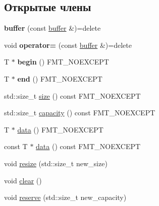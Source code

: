 \subsection*{Открытые члены}
\begin{DoxyCompactItemize}
\item 
\mbox{\label{classinternal_1_1buffer_a33507cbf77635b83d95b20f16c2bd9aa}} 
{\bfseries buffer} (const \hyperlink{classinternal_1_1buffer}{buffer} \&)=delete
\item 
\mbox{\label{classinternal_1_1buffer_aed8f870764a9e4cb1093952a5f297cfd}} 
void {\bfseries operator=} (const \hyperlink{classinternal_1_1buffer}{buffer} \&)=delete
\item 
\mbox{\label{classinternal_1_1buffer_ae45d3da165531762d01d8e17be21ebf1}} 
T $\ast$ {\bfseries begin} () F\+M\+T\+\_\+\+N\+O\+E\+X\+C\+E\+PT
\item 
\mbox{\label{classinternal_1_1buffer_a021ba696a608aba455fc40deccbd17d9}} 
T $\ast$ {\bfseries end} () F\+M\+T\+\_\+\+N\+O\+E\+X\+C\+E\+PT
\item 
std\+::size\+\_\+t \hyperlink{classinternal_1_1buffer_abac844b364cd93450a9c311807d15f80}{size} () const F\+M\+T\+\_\+\+N\+O\+E\+X\+C\+E\+PT
\item 
std\+::size\+\_\+t \hyperlink{classinternal_1_1buffer_ab71f52fc20af6ed2a15f75143c89e2a4}{capacity} () const F\+M\+T\+\_\+\+N\+O\+E\+X\+C\+E\+PT
\item 
T $\ast$ \hyperlink{classinternal_1_1buffer_aaaa371bd0a7aaad4af49363cb85fefb3}{data} () F\+M\+T\+\_\+\+N\+O\+E\+X\+C\+E\+PT
\item 
const T $\ast$ \hyperlink{classinternal_1_1buffer_a7ad3b2ff77f2b5ca94c45b9c17901212}{data} () const F\+M\+T\+\_\+\+N\+O\+E\+X\+C\+E\+PT
\item 
void \hyperlink{classinternal_1_1buffer_a4d38f4fdc2d4ca913a5a13523b690893}{resize} (std\+::size\+\_\+t new\+\_\+size)
\item 
void \hyperlink{classinternal_1_1buffer_a0837aac78fc5bc2ef51ea232b8e1df51}{clear} ()
\item 
void \hyperlink{classinternal_1_1buffer_a6aa946f91c0aeb68f06d3889ba9d5b48}{reserve} (std\+::size\+\_\+t new\+\_\+capacity)
\item 
\mbox{\label{classinternal_1_1buffer_a6c3ab2350cb36390cc118cd326c5522b}} 

\end{DoxyCompactItemize}
